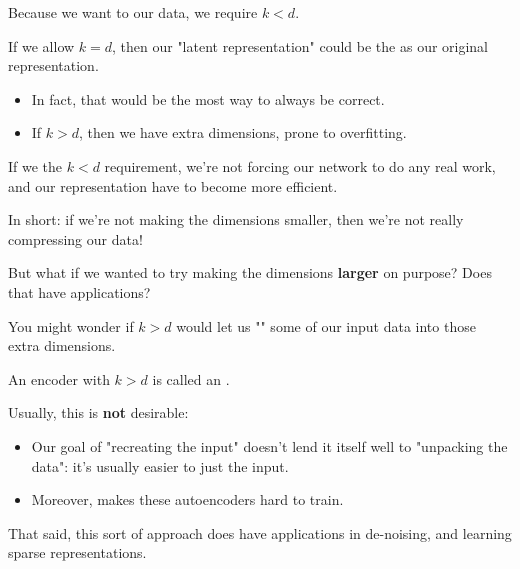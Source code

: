         \phantom{}

        \begin{clarification}
                Because we want to  our data, we require $k < d$. 

                If we allow $k=d$, then our "latent representation" could be the  as our original representation.
                \begin{itemize}
                    \item In fact, that would be the most  way to always be correct.
                    \item If $k>d$, then we have extra dimensions, prone to overfitting.
                \end{itemize}
    
                If we  the $k<d$ requirement, we're not forcing our network to do any real work, and our representation  have to become more efficient.
            \end{clarification}
    
            In short: if we're not making the dimensions smaller, then we're not really compressing our data!

            But what if we wanted to try making the dimensions \textbf{larger} on purpose? Does that have applications?\\

            \begin{concept}
                You might wonder if $k>d$ would let us "" some of our input data into those extra dimensions.
                
                An encoder with $k>d$ is called an .
                
                Usually, this is \textbf{not} desirable:
    
                \begin{itemize}
                    \item Our goal of "recreating the input" doesn't lend it itself well to "unpacking the data": it's usually easier to just  the input.
                    \item Moreover,  makes these autoencoders hard to train.
                \end{itemize}

                That said, this sort of approach does have applications in de-noising, and learning sparse representations.
            \end{concept}

